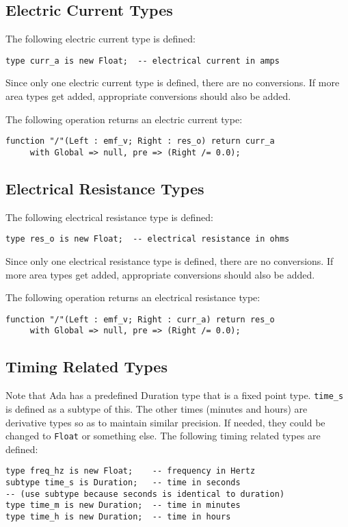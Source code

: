 \documentclass[10pt, openany]{book}
\newcommand{\datatype}[1]{\texttt{#1}}
\begin{document}
\subsection{Electric Current Types}
The following electric current type is defined:
\begin{lstlisting}
type curr_a is new Float;  -- electrical current in amps
\end{lstlisting}

Since only one electric current type is defined, there are no conversions.  If more area types get added, appropriate conversions should also be added.

The following operation returns an electric current type:
\begin{lstlisting}
function "/"(Left : emf_v; Right : res_o) return curr_a
     with Global => null, pre => (Right /= 0.0);
\end{lstlisting}

\subsection{Electrical Resistance Types}
The following electrical resistance type is defined:
\begin{lstlisting}
type res_o is new Float;  -- electrical resistance in ohms
\end{lstlisting}

Since only one electrical resistance type is defined, there are no conversions.  If more area types get added, appropriate conversions should also be added.

The following operation returns an electrical resistance type:
\begin{lstlisting}
function "/"(Left : emf_v; Right : curr_a) return res_o
     with Global => null, pre => (Right /= 0.0);
\end{lstlisting}

\subsection{Timing Related Types}
Note that Ada has a predefined Duration type that is a fixed point type.  \datatype{time\_s} is defined as a subtype of this.  The other times (minutes and hours) are derivative types so as to maintain similar precision.  If needed, they could be changed to \datatype{Float} or something else.  The following timing related types are defined:
\begin{lstlisting}
type freq_hz is new Float;    -- frequency in Hertz
subtype time_s is Duration;   -- time in seconds
-- (use subtype because seconds is identical to duration)
type time_m is new Duration;  -- time in minutes
type time_h is new Duration;  -- time in hours
\end{lstlisting}
\end{document}

